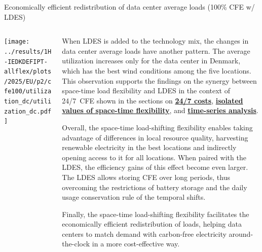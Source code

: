 \begin{frame}{{\normalsize Economically efficient redistribution of data center average loads (100\% CFE w/ LDES)}}
  \label{redistribution-p2}

  {\footnotesize
  
  \begin{columns}[T]
  \begin{column}{6cm}
    \centering
    \texttt{[image: ../results/1H-IEDKDEFIPT-allflex/plots/2025/EU/p2/cfe100/utilization\_dc/utilization\_dc.pdf]}  
  \end{column}

  \begin{column}{8.5cm}
    When LDES is added to the technology mix, the changes in data center average loads have another pattern. The average utilization increases only for the data center in Denmark, which has \alert{the best wind conditions} among the five locations.
    This observation supports the findings on the synergy between space-time load flexibility and LDES in the context of 24/7~CFE shown in the sections on {\bf \hyperlink{247costs-p2}{24/7 costs}}, {\bf \hyperlink{isolated-p2}{isolated values of space-time flexibility}}, and {\bf \hyperlink{timeseries-p2}{time-series analysis}}. 
      
    \vspace{0.1cm}
    Overall, the space-time load-shifting flexibility enables taking advantage of differences in local resource quality, harvesting renewable electricity in the best locations and indirectly \alert{opening access to it for all locations}.
    When paired with the LDES, the efficiency gains of this effect become even larger. The LDES allows storing CFE over long periods, thus overcoming the restrictions of battery storage and the daily usage conservation rule of the temporal shifts. 
    
    \vspace{0.1cm}
    Finally, the space-time load-shifting flexibility facilitates the \alert{economically efficient redistribution of loads}, helping data centers to match demand with carbon-free electricity around-the-clock in a more cost-effective way. 

  \end{column}
  \end{columns}
  }
\end{frame}




